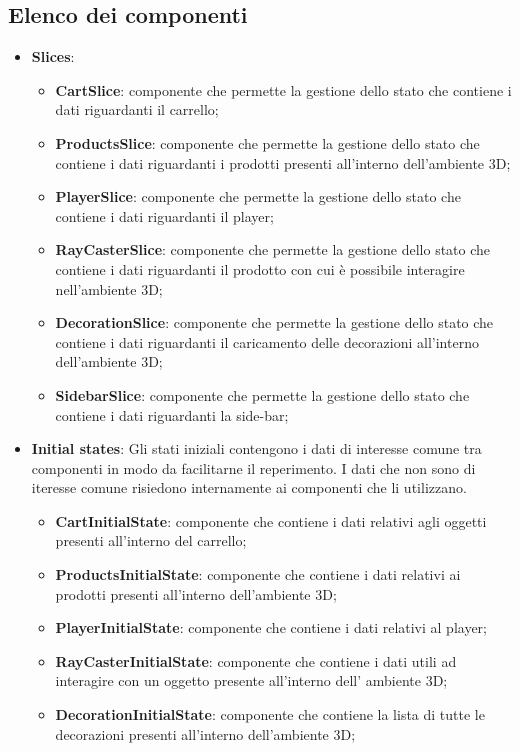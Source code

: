 \subsection{Elenco dei componenti}
\begin{itemize}
	\item \textbf{\large Slices}:
		\begin{itemize}
			\item \textbf{CartSlice}: componente che permette la gestione dello stato che contiene i dati riguardanti il carrello;
			\item \textbf{ProductsSlice}: componente che permette la gestione dello stato che contiene i dati riguardanti i prodotti 
			presenti all'interno dell'ambiente 3D;
			\item \textbf{PlayerSlice}: componente che permette la gestione dello stato che contiene i dati riguardanti il player;
			\item \textbf{RayCasterSlice}: componente che permette la gestione dello stato che contiene i dati riguardanti il
			prodotto con cui è possibile interagire nell'ambiente 3D;
			\item \textbf{DecorationSlice}: componente che permette la gestione dello stato che contiene i dati riguardanti
			il caricamento delle decorazioni all'interno dell'ambiente 3D;
			\item \textbf{SidebarSlice}: componente che permette la gestione dello stato che contiene i dati riguardanti
			la side-bar;
		\end{itemize}
	\item \textbf{\large Initial states}:
	Gli stati iniziali contengono i dati di interesse comune tra componenti in modo da facilitarne il reperimento.
	I dati che non sono di iteresse comune risiedono internamente ai componenti che li utilizzano.
		\begin{itemize}
			\item \textbf{CartInitialState}: componente che contiene i dati relativi agli oggetti presenti all'interno del carrello;
			\item \textbf{ProductsInitialState}: componente che contiene i dati relativi ai prodotti presenti all'interno dell'ambiente 3D;
			\item \textbf{PlayerInitialState}: componente che contiene i dati relativi al player;
			\item \textbf{RayCasterInitialState}: componente che contiene i dati utili ad interagire con un oggetto presente all'interno dell'
			ambiente 3D;
			\item \textbf{DecorationInitialState}: componente che contiene la lista di tutte le decorazioni presenti all'interno dell'ambiente 3D;

\end{itemize}
\end{itemize}
